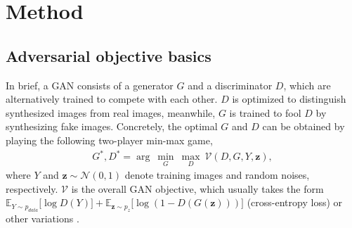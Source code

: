 \documentclass[10pt,twocolumn,letterpaper]{article}
\begin{document}
\section{Method}

\subsection{Adversarial objective basics}
In brief, a GAN \cite{goodfellow2014generative} consists of a generator $G$ and a discriminator $D$, which are alternatively trained to compete with each other. $D$ is optimized to distinguish synthesized images from real images, meanwhile, $G$ is trained to fool $D$ by synthesizing fake images. Concretely, the optimal $G$ and $D$ can be obtained by playing the following two-player min-max game,
\begin{equation}
\label{equ:GAN}
\begin{split}
G^*, D^* = \arg~\underset{G}{\min}\ \underset{D}{\max}~ \mathcal{V}(D, G, Y, \bm z),
\end{split}
\end{equation}
where $Y$ and $\bm z \sim \mathcal{N}(0,1)$ denote training images and random noises, respectively. 
$\mathcal{V}$ is the overall GAN objective, which usually takes the form $\mathbb{E}_{Y\sim p_{data}}\big[\log D(Y)\big] + \mathbb{E}_{\bm z\sim p_{z}}\big[\log (1-D(G(\bm z)))\big]$ (cross-entropy loss) or other variations \cite{lsgan,berthelot2017began}.

\end{document}
